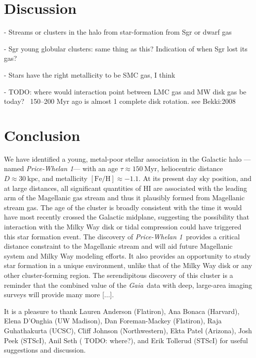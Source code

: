 \documentclass[modern]{aastex62}
\newcommand{\gaia}{\textsl{Gaia}}
\newcommand{\todo}[1]{{\color{red} TODO: #1}}
\newcommand{\kpc}{\textrm{kpc}}
\newcommand{\feh}{\ensuremath{[\textrm{Fe} / \textrm{H}]}}
\newcommand{\hi}{H{\footnotesize I} }
\newcommand{\clustername}{\textsl{Price-Whelan 1}}
\begin{document}
\section{Discussion} \label{sec:discussion}

- Streams or clusters in the halo from star-formation from Sgr or dwarf gas

- Sgr young globular clusters: same thing as this? Indication of when Sgr lost its gas?

- Stars have the right metallicity to be SMC gas, I think

- TODO: where would interaction point between LMC gas and MW disk gas be today? ~150–200 Myr ago is almost 1 complete disk rotation. see Bekki:2008


\section{Conclusion} \label{sec:conclusion}

We have identified a young, metal-poor stellar association in the Galactic halo --- named \clustername --- with an age $\tau \approx 150~\textrm{Myr}$, heliocentric distance $D \approx 30~\kpc$, and metallicity $\feh \approx -1.1$.
At its present day sky position, and at large distances, all significant quantities of \hi are associated with the leading arm of the Magellanic gas stream and thus it plausibly formed from Magellanic stream gas.
The age of the cluster is broadly consistent with the time it would have most recently crossed the Galactic midplane, suggesting the possibility that interaction with the Milky Way disk or tidal compression could have triggered this star formation event.
The discovery of \clustername\ provides a critical distance constraint to the Magellanic stream and will aid future Magellanic system and Milky Way modeling efforts.
It also provides an opportunity to study star formation in a unique environment, unlike that of the Milky Way disk or any other cluster-forming region.
The serendipitous discovery of this cluster is a reminder that the combined value of the \gaia\ data with deep, large-area imaging surveys will provide many more [...].


\acknowledgments

It is a pleasure to thank
Lauren Anderson (Flatiron),
Ana Bonaca (Harvard),
Elena D'Onghia (UW Madison),
Dan Foreman-Mackey (Flatiron),
Raja Guhathakurta (UCSC),
Cliff Johnson (Northwestern),
Ekta Patel (Arizona),
Josh Peek (STScI),
Anil Seth (\todo{where?}),
and Erik Tollerud (STScI)
for useful suggestions and discussion.
\end{document}

